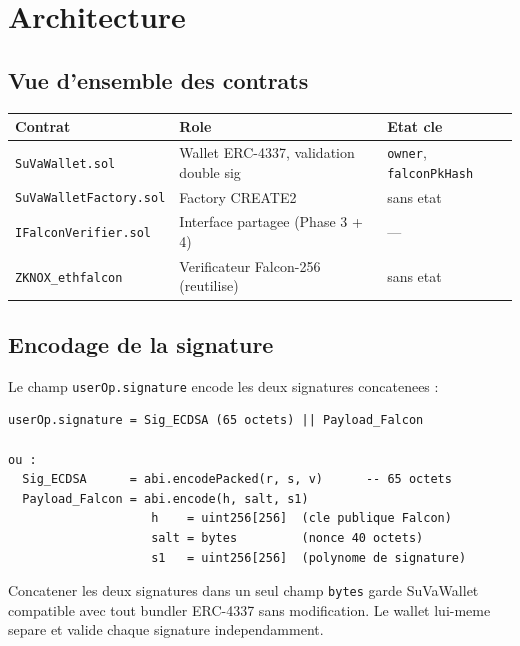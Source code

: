 \documentclass[11pt,a4paper]{article}
\begin{document}
\section{Architecture}

\subsection{Vue d'ensemble des contrats}

\begin{center}
\begin{tabular}{lll}
\toprule
\textbf{Contrat} & \textbf{Role} & \textbf{Etat cle} \\
\midrule
\texttt{SuVaWallet.sol}        & Wallet ERC-4337, validation double sig & \texttt{owner}, \texttt{falconPkHash} \\
\texttt{SuVaWalletFactory.sol} & Factory CREATE2                        & sans etat \\
\texttt{IFalconVerifier.sol}   & Interface partagee (Phase 3 + 4)       & --- \\
\texttt{ZKNOX\_ethfalcon}      & Verificateur Falcon-256 (reutilise)    & sans etat \\
\bottomrule
\end{tabular}
\end{center}

\subsection{Encodage de la signature}

Le champ \texttt{userOp.signature} encode les deux signatures concatenees :

\begin{lstlisting}[style=bash, caption={Structure de la signature composite}]
userOp.signature = Sig_ECDSA (65 octets) || Payload_Falcon

ou :
  Sig_ECDSA      = abi.encodePacked(r, s, v)      -- 65 octets
  Payload_Falcon = abi.encode(h, salt, s1)
                    h    = uint256[256]  (cle publique Falcon)
                    salt = bytes         (nonce 40 octets)
                    s1   = uint256[256]  (polynome de signature)
\end{lstlisting}

\begin{infobox}
Concatener les deux signatures dans un seul champ \texttt{bytes} garde SuVaWallet compatible
avec tout bundler ERC-4337 sans modification. Le wallet lui-meme separe et valide chaque
signature independamment.
\end{infobox}
\end{document}
